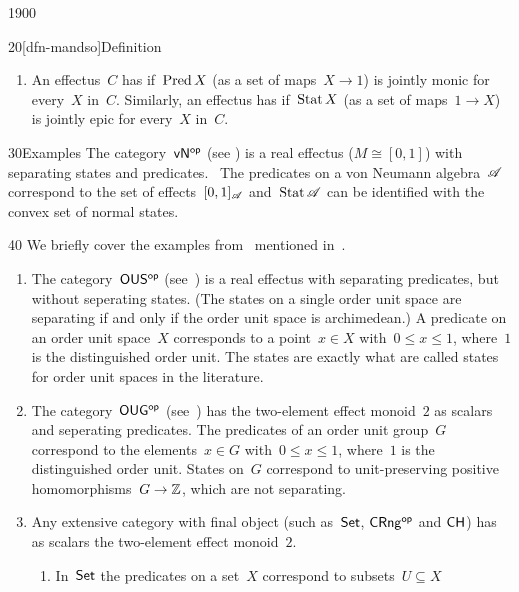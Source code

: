 \begin{parsec}{1900}
\begin{point}{20}[dfn-mandso]{Definition}
\begin{enumerate}
We denote the set of states on~$X$ by~$\Define{\Stat X}$.
\item
An effectus~$C$ has 
        if~$\operatorname{Pred} X$ (as a set of maps~$X \to 1$)
        is jointly monic for every~$X$ in~$C$.
    Similarly, an effectus has 
        if~$\operatorname{Stat} X$ (as a set of maps~$1 \to X$)
        is jointly epic for every~$X$ in~$C$.
\end{enumerate}
\spacingfix{}
\end{point}
\begin{point}{30}{Examples}%
    The category~${\mathsf{vN}}{^{\mathsf{op}}}$ (see )
    is a real effectus ($M \cong [0,1]$)
    with separating states and predicates.~\cite{effintro}
The predicates on a von Neumann algebra~$\mathscr{A}$
    correspond to the set of effects~$[0,1]_{\mathscr{A}}$
    and~$\operatorname{Stat} \mathscr{A}$ can be identified with the convex set of normal states.
\begin{point}{40}%
We briefly cover the examples from~\cite{effintro}
    mentioned in~.
\begin{enumerate}
\item
The category~${\mathsf{OUS}}{^{\mathsf{op}}}$ (see~)
    is a real effectus with separating predicates,
    but without seperating states.
    (The states on a single order unit space are separating
        if and only if the order unit space is archimedean.)
A predicate on an order unit space~$X$
    corresponds  to a point~$x \in X$ with~$0 \leq x \leq 1$,
    where~$1$ is the distinguished order unit.
The states are exactly what are called states for order unit spaces
    in the literature.
\item
The category~${\mathsf{OUG}}{^{\mathsf{op}}}$  (see~)
    has the two-element effect monoid~$2$ as scalars
        and seperating predicates.
The predicates of an order unit group~$G$ correspond
    to the elements~$x \in G$ with~$0 \leq x \leq 1$,
        where~$1$ is the distinguished order unit.
States on~$G$ correspond to unit-preserving positive
    homomorphisms~$G \to \mathbb{Z}$, which are not separating.
\item
Any extensive category with final object
    (such as~$\mathsf{Set}$, ${\mathsf{CRng}}{^{\mathsf{op}}}$ and $\mathsf{CH}$)
    has as scalars the two-element effect monoid~$2$.
\begin{enumerate}
\item
In~$\mathsf{Set}$ the predicates on a set~$X$ correspond to subsets~$U \subseteq X$

\end{enumerate}
\end{enumerate}
\end{point}
\end{point}
\end{parsec}
